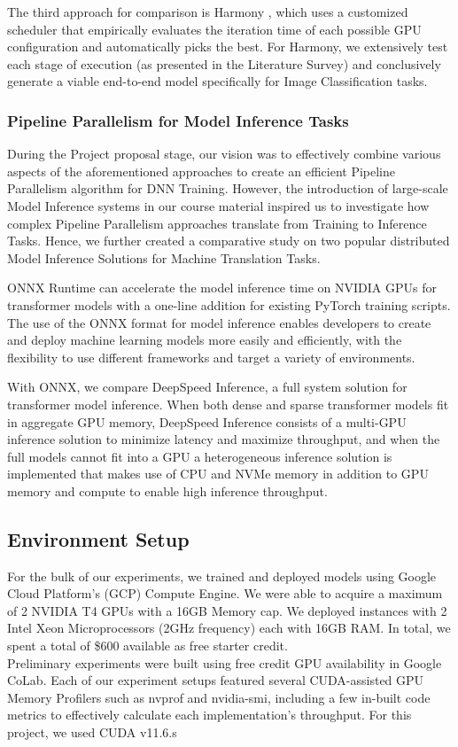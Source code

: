 \documentclass[conference]{IEEEtran}
\begin{document}
The third approach for comparison is Harmony \cite{b5}, which uses a customized scheduler that empirically evaluates the iteration time of each possible GPU configuration and automatically picks the best. For Harmony, we extensively test each stage of execution (as presented in the Literature Survey) and conclusively generate a viable end-to-end model specifically for Image Classification tasks. \\ 

\subsubsection{Pipeline Parallelism for Model Inference Tasks} 
During the Project proposal stage, our vision was to effectively combine various aspects of the aforementioned approaches to create an efficient Pipeline Parallelism algorithm for DNN Training. However, the introduction of large-scale Model Inference systems in our course material inspired us to investigate how complex Pipeline Parallelism approaches translate from Training to Inference Tasks. Hence, we further created a comparative study on two popular distributed Model Inference Solutions for Machine Translation Tasks. 

ONNX Runtime can accelerate the model inference time on NVIDIA GPUs for transformer models with a one-line addition for existing PyTorch training scripts. The use of the ONNX format for model inference enables developers to create and deploy machine learning models more easily and efficiently, with the flexibility to use different frameworks and target a variety of environments.

With ONNX, we compare DeepSpeed Inference, a full system solution for transformer model inference. When both dense and sparse transformer models fit in aggregate GPU memory, DeepSpeed Inference consists of a multi-GPU inference solution to minimize latency and maximize throughput, and when the full models cannot fit into a GPU a heterogeneous inference solution is implemented that makes use of CPU and NVMe memory in addition to GPU memory and compute to enable high inference throughput.

\subsection{Environment Setup}
For the bulk of our experiments, we trained and deployed models using Google Cloud Platform's (GCP) Compute Engine. We were able to acquire a maximum of 2 NVIDIA T4 GPUs with a 16GB Memory cap. We deployed instances with 2 Intel Xeon Microprocessors (2GHz frequency) each with 16GB RAM. In total, we spent a total of \$600 available as free starter credit. \\
Preliminary experiments were built using free credit GPU availability in Google CoLab. Each of our experiment setups featured several CUDA-assisted GPU Memory Profilers such as nvprof and nvidia-smi, including a few in-built code metrics to effectively calculate each implementation's throughput. For this project, we used CUDA v11.6.s
\end{document}
